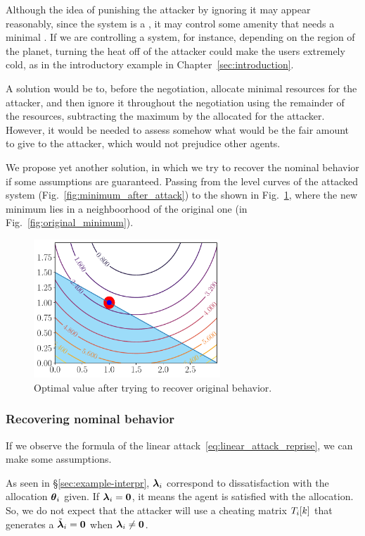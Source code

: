 \documentclass[../main.tex]{subfiles}
\begin{document}
Although the idea of punishing the attacker by ignoring it may appear reasonably, since the system is a \cps{}, it may control some amenity that needs a minimal \QoS{}.
If we are controlling a \HVAC{} system, for instance, depending on the region of the planet, turning the heat off of the attacker could make the users extremely cold, as in the introductory example in Chapter~\ref{sec:introduction}.

A solution would be to, before the negotiation, allocate minimal resources for the attacker, and then ignore it throughout the negotiation using the remainder of the resources, subtracting the maximum by the allocated for the attacker.
However, it would be needed to assess somehow what would be the fair amount to give to the attacker, which would not prejudice other agents.

We propose yet another solution, in which we try to recover the nominal behavior if some assumptions are guaranteed.
Passing from the level curves of the attacked system (Fig.~\ref{fig:minimum_after_attack}) to the shown in Fig.~\ref{fig:minimum_recovered}, where the new minimum lies in a neighboorhood of the original one (in Fig.~\ref{fig:original_minimum}).

\begin{figure}[h]
  \centering
  \includegraphics[width=7cm]{../img/resilient_eq/correctX.pdf}
  \caption{Optimal value after trying to recover original behavior.}\label{fig:minimum_recovered}
\end{figure}

\subsubsection{Recovering nominal behavior}\label{sec:recov-nomin-behav}
If we observe the formula of the linear attack~\eqref{eq:linear_attack_reprise}, we can make some assumptions.

As seen in \S\ref{sec:example-interpr}, $\boldsymbol{\lambda}_{i}$ correspond to dissatisfaction with the allocation $\boldsymbol{\theta}_{i}$ given.
If $\boldsymbol{\lambda}_{i}=\mathbf{0}$, it means the agent is satisfied with the allocation.
So, we do not expect that the attacker will use a cheating matrix $T_{i}[k]$ that generates a $\tilde{\boldsymbol{\lambda}}_{i}=\mathbf{0}$ when $\boldsymbol{\lambda}_{i}\neq\mathbf{0}$.
\end{document}
